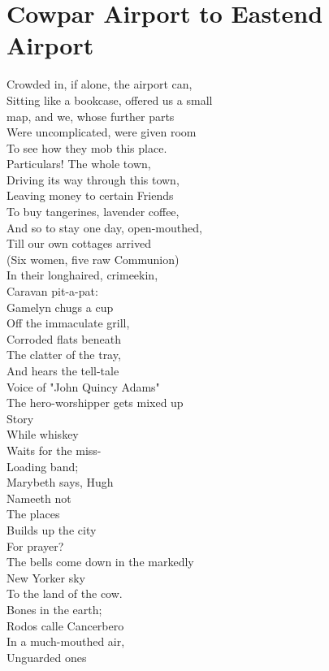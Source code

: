 \documentclass[smalldemyvopaper,11pt,twoside,onecolumn,openright,extrafontsizes]{memoir}
\begin{document}
\chapter{Cowpar Airport to Eastend Airport}
Crowded in, if alone, the airport can,
\\Sitting like a bookcase, offered us a small
\\map, and we, whose further parts
\\Were uncomplicated, were given room
\\To see how they mob this place.
\\Particulars! The whole town,
\\Driving its way through this town,
\\Leaving money to certain Friends
\\To buy tangerines, lavender coffee,
\\And so to stay one day, open-mouthed,
\\Till our own cottages arrived
\\(Six women, five raw Communion)
\\In their longhaired, crimeekin,
\\Caravan pit-a-pat:
\\Gamelyn chugs a cup
\\Off the immaculate grill,
\\Corroded flats beneath
\\The clatter of the tray,
\\And hears the tell-tale
\\Voice of "John Quincy Adams"
\\The hero-worshipper gets mixed up
\\Story
\\While whiskey
\\Waits for the miss-
\\Loading band;
\\Marybeth says, Hugh
\\Nameeth not
\\The places
\\Builds up the city
\\For prayer?
\\The bells come down in the markedly
\\New Yorker sky
\\To the land of the cow.
\\Bones in the earth;
\\Rodos calle Cancerbero
\\In a much-mouthed air,
\\Unguarded ones
\end{document}
